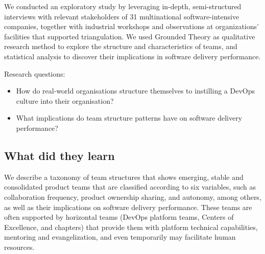 We conducted an exploratory study by leveraging in-depth, semi-structured interviews with relevant stakeholders of 31 multinational software-intensive companies, together with industrial workshops and observations at organizations’ facilities that supported triangulation. We used Grounded Theory as qualitative research method to explore the structure and characteristics of teams, and statistical analysis to discover their implications in software delivery performance.

Research questions:

\begin{itemize}
    \item How do real-world organisations structure themselves to instilling a DevOps culture into their organisation?
    \item What implications do team structure patterns have on software delivery performance?
\end{itemize}

\subsection{What did they learn}

We describe a taxonomy of team structures that shows emerging, stable and consolidated product teams that are classified according to six variables, such as collaboration frequency, product ownership sharing, and autonomy, among others, as well as their implications on software delivery performance. These teams are often supported by horizontal teams (DevOps platform teams, Centers of Excellence, and chapters) that provide them with platform technical capabilities, mentoring and evangelization, and even temporarily may facilitate human resources.
